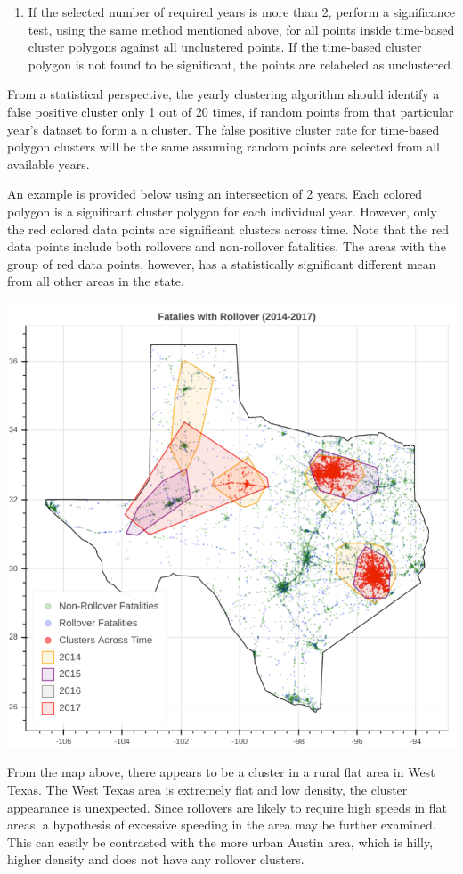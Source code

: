\documentclass{article}
\begin{document}
\begin{enumerate}
	\item If the selected number of required years is more than 2, perform a significance test, using the same method mentioned above, for all points inside time-based cluster polygons against all unclustered points. If the time-based cluster polygon is not found to be significant, the points are relabeled as unclustered.
\end{enumerate}
From a statistical perspective, the yearly clustering algorithm should identify a false positive cluster only 1 out of 20 times, if random points from that particular year's dataset to form a a cluster. The false positive cluster rate for time-based polygon clusters will be the same assuming random points are selected from all available years.

An example is provided below using an intersection of 2 years. Each colored polygon is a significant cluster polygon for each individual year. However, only the red colored data points are significant clusters across time. Note that the red data points include both rollovers and non-rollover fatalities. The areas with the group of red data points, however, has a statistically significant different mean from all other areas in the state.
\begin{center}
\includegraphics[scale=0.4]{technical.png}
\end{center}
From the map above, there appears to be a cluster in a rural flat area in West Texas. The West Texas area is extremely flat and low density, the cluster appearance is unexpected. Since rollovers are likely to require high speeds in flat areas, a hypothesis of excessive speeding in the area may be further examined. This can easily be contrasted with the more urban Austin area, which is hilly, higher density and does not have any rollover clusters.



\end{document}
